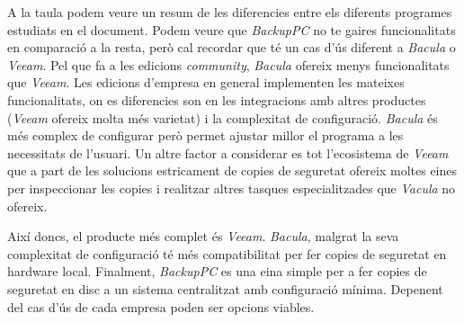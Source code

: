 A la taula podem veure un resum de les diferencies entre els diferents programes
estudiats en el document. Podem veure que \emph{BackupPC} no te gaires
funcionalitats en comparació a la resta, però cal recordar que té un cas d'ús
diferent a \emph{Bacula} o \emph{Veeam}. Pel que fa a les edicions
\emph{community}, \emph{Bacula} ofereix menys funcionalitats que \emph{Veeam}.
Les edicions d'empresa en general implementen les mateixes funcionalitats, on es
diferencies son en les integracions amb altres productes (\emph{Veeam} ofereix
molta més varietat) i la complexitat de configuració. \emph{Bacula} és més
complex de configurar però permet ajustar millor el programa a les necessitats
de l'usuari. Un altre factor a considerar es tot l'ecosistema de \emph{Veeam}
que a part de les solucions estricament de copies de seguretat ofereix moltes
eines per inspeccionar les copies i realitzar altres tasques especialitzades que
\emph{Vacula} no ofereix.

Així doncs, el producte més complet és \emph{Veeam}. \emph{Bacula}, malgrat la
seva complexitat de configuració té més compatibilitat per fer copies de
seguretat en hardware local. Finalment, \emph{BackupPC} es una eina simple per a
fer copies de seguretat en disc a un sistema centralitzat amb configuració
mínima. Depenent del cas d'ús de cada empresa poden ser opcions viables.
